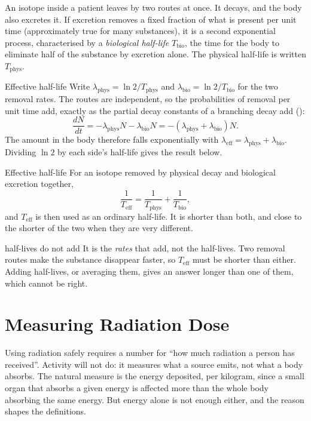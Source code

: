 An isotope inside a patient leaves by two routes at once. It decays, and the body also excretes it. If
excretion removes a fixed fraction of what is present per unit time (approximately true for many
substances), it is a second exponential process, characterised by a \emph{biological half-life}
$T_\text{bio}$, the time for the body to eliminate half of the substance by excretion alone. The physical
half-life is written $T_\text{phys}$.

\begin{derivbox}{Effective half-life}
Write $\lambda_\text{phys}=\ln2/T_\text{phys}$ and $\lambda_\text{bio}=\ln2/T_\text{bio}$ for the two
removal rates. The routes are independent, so the probabilities of removal per unit time add, exactly as
the partial decay constants of a branching decay add ():
\[
\frac{dN}{dt}=-\lambda_\text{phys}N-\lambda_\text{bio}N=-(\lambda_\text{phys}+\lambda_\text{bio})N .
\]
The amount in the body therefore falls exponentially with $\lambda_\text{eff}=\lambda_\text{phys}
+\lambda_\text{bio}$. Dividing $\ln2$ by each side's half-life gives the result below.
\end{derivbox}

\begin{keybox}{Effective half-life}
For an isotope removed by physical decay and biological excretion together,
\[
\frac{1}{T_\text{eff}}=\frac{1}{T_\text{phys}}+\frac{1}{T_\text{bio}},
\]
and $T_\text{eff}$ is then used as an ordinary half-life. It is shorter than both, and close to the
shorter of the two when they are very different.
\end{keybox}

\begin{trapbox}{half-lives do not add}
It is the \emph{rates} that add, not the half-lives. Two removal routes make the substance disappear
faster, so $T_\text{eff}$ must be shorter than either. Adding half-lives, or averaging them, gives an
answer longer than one of them, which cannot be right.
\end{trapbox}

\section{Measuring Radiation Dose}\label{sec:nucapp-dose}

Using radiation safely requires a number for ``how much radiation a person has received''. Activity will
not do: it measures what a source emits, not what a body absorbs. The natural measure is the energy
deposited, per kilogram, since a small organ that absorbs a given energy is affected more than the whole
body absorbing the same energy. But energy alone is not enough either, and the reason shapes the
definitions.

